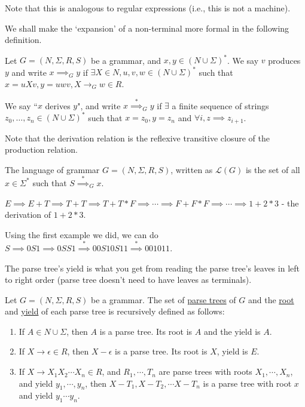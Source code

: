 \documentclass[a4paper]{article}
\newcommand{\nl}{\vspace{0.2cm}\\}
\newcommand{\mc}{\mathcal}
\renewcommand{\L}{\mc{L}}
\newcommand{\produces}{\implies}
\newcommand{\derives}{\stackrel{*}{\implies}}
\begin{document}
Note that this is analogous to regular expressions (i.e., this is not a machine).

We shall make the `expansion' of a non-terminal more formal in the following definition.\nl

\begin{defn}
    Let $G = (N, \Sigma, R, S)$ be a grammar, and $x, y \in (N \cup \Sigma)^*$. We say $v$ produces $y$ and write $x \implies_G y$ if $\exists X \in N, u, v, w \in (N \cup \Sigma)^*$ such that $x
    = uXv, y = uwv, X \to_G w \in R$.
\end{defn}


\begin{defn}
    We say ``$x$ derives $y$", and write $x \derives_G y$ if $\exists$ a finite sequence of strings $z_0, \ldots, z_n \in (N \cup \Sigma)^*$ such that $x = z_0, y = z_n$ and $\forall i, z \produces z_{i+1}$.
\end{defn}

Note that the derivation relation is the reflexive transitive closure of the production relation.\nl

\begin{defn}
    The language of grammar $G = (N, \Sigma, R, S)$, written as $\L(G)$ is the set of all $x \in \Sigma^*$ such that $S \derives_G x$.
\end{defn}

\begin{eg}
    $E \produces E + T \produces T + T \produces T + T * F \produces \cdots \produces F + F * F \produces \cdots \produces 1 + 2 * 3$ - the derivation of $1 + 2 * 3$.
\end{eg}

\begin{eg}
    Using the first example we did, we can do $S \produces 0S1 \produces 0SS1 \derives 00S10S11 \derives 001011$.
\end{eg}

The parse tree's yield is what you get from reading the parse tree's leaves in left to right order (parse tree doesn't need to have leaves as terminals).\nl

\begin{defn}
    Let $G = (N, \Sigma, R, S)$ be a grammar. The set of \underline{parse trees} of $G$ and the \underline{root} and \underline{yield} of each parse tree is recursively defined as follows:
    \begin{enumerate}
        \item If $A \in N \cup \Sigma$, then $A$ is a parse tree. Its root is $A$ and the yield is $A$.
        \item If $X \to \epsilon \in R$, then $X - \epsilon$ is a parse tree. Its root is $X$, yield is $E$.
        \item If $X \to X_1 X_2 \cdots X_n \in R$, and $R_1, \cdots, T_n$ are parse trees with roots $X_1, \cdots, X_n$, and yield $y_1, \cdots, y_n$, then 
            $X - T_1, X - T_2, \cdots X - T_n$ is a parse tree with root $x$ and yield $y_1 \cdots y_n$.
    \end{enumerate}
\end{defn}
\end{document}
